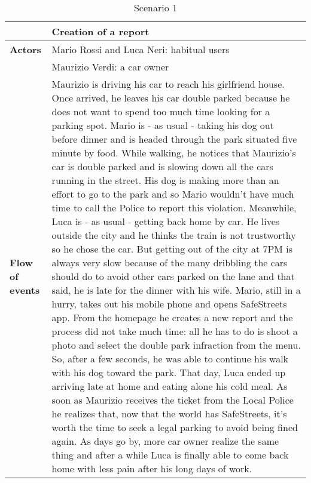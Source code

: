 \begin{table}[!htbp]
\centering
\begin{tabular}{lp{10.8cm}}
\hline
\bf\large  &\bf\large Creation of a report\\
\hline
\hline

\bf Actors&Mario Rossi and Luca Neri: habitual users\\
\bf &Maurizio Verdi: a car owner\\
\hline
\bf Flow of events&
Maurizio is driving his car to reach his girlfriend house. Once arrived, he leaves his car double parked because he does not want to spend too much time looking for a parking spot.
Mario is - as usual - taking his dog out before dinner and is headed through the park situated five minute by food. While walking, he notices that Maurizio's car is double parked and is slowing down all the cars running in the street. His dog is making more than an effort to go to the park and so Mario wouldn't have much time to call the Police to report this violation.
Meanwhile, Luca is - as usual - getting back home by car. He lives outside the city and he thinks the train is not trustworthy so he chose the car. But getting out of the city at 7PM is always very slow because of the many dribbling the cars should do to avoid other cars parked on the lane and that said, he is late for the dinner with his wife.  
Mario, still in a hurry, takes out his mobile phone and opens SafeStreets app. From the homepage he creates a new report and the process did not take much time: all he has to do is shoot a photo and select the double park infraction from the menu. So, after a few seconds, he was able to continue his walk with his dog toward the park. That day, Luca ended up arriving late at home and eating alone his cold meal. As soon as Maurizio receives the ticket from the Local Police he realizes that, now that the world has SafeStreets, it's worth the time to seek a legal parking to avoid being fined again. As days go by, more car owner realize the same thing and after a while Luca is finally able to come back home with less pain after his long days of work.
\end{tabular}
\caption{Scenario 1} 
\label{tab:scenarioone}
\end{table}